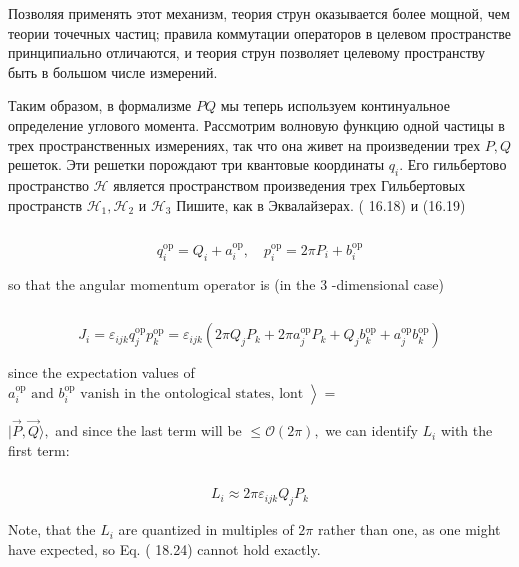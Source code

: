 \documentclass[main.tex]{subfiles}
\begin{document}
Позволяя применять этот механизм, теория струн оказывается более мощной, чем теории точечных частиц; правила коммутации операторов в целевом пространстве принципиально отличаются, и теория струн позволяет целевому пространству быть в большом числе измерений.

Таким образом, в формализме $P Q$ мы теперь используем континуальное определение углового момента. Рассмотрим волновую функцию одной частицы в трех пространственных измерениях, так что она живет на произведении трех $P, Q$ решеток. Эти решетки порождают три квантовые координаты $q_{i} .$ Его гильбертово пространство $\mathcal{H}$ является пространством произведения трех Гильбертовых пространств $\mathcal{H}_{1}, \mathcal{H}_{2}$ и $\mathcal{H}_{3}$
Пишите, как в Эквалайзерах. ( 16.18) и (16.19)

\begin{equation}\label{}
	
\end{equation}

$$
q_{i}^{\mathrm{op}}=Q_{i}+a_{i}^{\mathrm{op}}, \quad p_{i}^{\mathrm{op}}=2 \pi P_{i}+b_{i}^{\mathrm{op}}
$$

so that the angular momentum operator is (in the 3 -dimensional case)

\begin{equation}\label{}
	
\end{equation}

$$
J_{i}=\varepsilon_{i j k} q_{j}^{\mathrm{op}} p_{k}^{\mathrm{op}}=\varepsilon_{i j k}\left(2 \pi Q_{j} P_{k}+2 \pi a_{j}^{\mathrm{op}} P_{k}+Q_{j} b_{k}^{\mathrm{op}}+a_{j}^{\mathrm{op}} b_{k}^{\mathrm{op}}\right)
$$

since the expectation values of $\left.a_{i}^{\mathrm{op}} \text { and } b_{i}^{\mathrm{op}} \text { vanish in the ontological states, lont }\right\rangle=$

$|\vec{P}, \vec{Q}\rangle,$ and since the last term will be $\leq \mathcal{O}(2 \pi),$ we can identify $L_{i}$ with the first term:

\begin{equation}\label{}
	
\end{equation}

$$
L_{i} \approx 2 \pi \varepsilon_{i j k} Q_{j} P_{k}
$$

Note, that the $L_{i}$ are quantized in multiples of $2 \pi$ rather than one, as one might have expected, so Eq. ( 18.24) cannot hold exactly.
\end{document}
